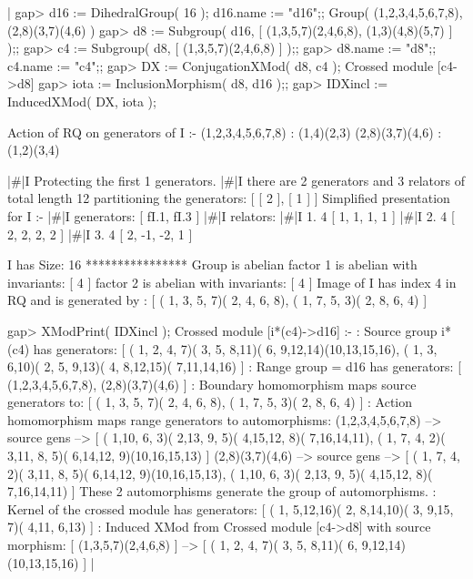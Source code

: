 |    gap> d16 := DihedralGroup( 16 );  d16.name := "d16";;
    Group( (1,2,3,4,5,6,7,8), (2,8)(3,7)(4,6) )
    gap> d8 := Subgroup( d16, [ (1,3,5,7)(2,4,6,8), (1,3)(4,8)(5,7) ] );;
    gap> c4 := Subgroup( d8, [ (1,3,5,7)(2,4,6,8) ] );;
    gap> d8.name :=  "d8";;  c4.name := "c4";;
    gap> DX := ConjugationXMod( d8, c4 );
    Crossed module [c4->d8]
    gap> iota := InclusionMorphism( d8, d16 );;
    gap> IDXincl := InducedXMod( DX, iota );

    Action of RQ on generators of I :- 
      (1,2,3,4,5,6,7,8) : (1,4)(2,3)
      (2,8)(3,7)(4,6) : (1,2)(3,4)

    |\#|I  Protecting the first 1 generators.
    |\#|I  there are 2 generators and 3 relators of total length 12
    partitioning the generators: [ [ 2 ], [ 1 ] ]
    Simplified presentation for I :- 
    |\#|I  generators: [ fI.1, fI.3 ]
    |\#|I  relators:
    |\#|I  1.  4  [ 1, 1, 1, 1 ]
    |\#|I  2.  4  [ 2, 2, 2, 2 ]
    |\#|I  3.  4  [ 2, -1, -2, 1 ]

     I has Size: 16
    **************** 
    Group is abelian 
    factor 1 is abelian with invariants: [ 4 ]
    factor 2 is abelian with invariants: [ 4 ]
    Image of I has index 4 in RQ and is generated by :   
    [ ( 1, 3, 5, 7)( 2, 4, 6, 8), ( 1, 7, 5, 3)( 2, 8, 6, 4) ]

    gap> XModPrint( IDXincl );
    Crossed module [i*(c4)->d16] :- 
    : Source group i*(c4) has generators:
      [ ( 1, 2, 4, 7)( 3, 5, 8,11)( 6, 9,12,14)(10,13,15,16), 
        ( 1, 3, 6,10)( 2, 5, 9,13)( 4, 8,12,15)( 7,11,14,16) ]
    : Range group = d16 has generators:
      [ (1,2,3,4,5,6,7,8), (2,8)(3,7)(4,6) ]
    : Boundary homomorphism maps source generators to:
      [ ( 1, 3, 5, 7)( 2, 4, 6, 8), ( 1, 7, 5, 3)( 2, 8, 6, 4) ]
    : Action homomorphism maps range generators to automorphisms:
      (1,2,3,4,5,6,7,8) --> { source gens --> 
    [ ( 1,10, 6, 3)( 2,13, 9, 5)( 4,15,12, 8)( 7,16,14,11), 
      ( 1, 7, 4, 2)( 3,11, 8, 5)( 6,14,12, 9)(10,16,15,13) ] }
      (2,8)(3,7)(4,6) --> { source gens --> 
    [ ( 1, 7, 4, 2)( 3,11, 8, 5)( 6,14,12, 9)(10,16,15,13), 
      ( 1,10, 6, 3)( 2,13, 9, 5)( 4,15,12, 8)( 7,16,14,11) ] }
      These 2 automorphisms generate the group of automorphisms.
    : Kernel of the crossed module has generators:
      [ ( 1, 5,12,16)( 2, 8,14,10)( 3, 9,15, 7)( 4,11, 6,13) ]
    : Induced XMod from Crossed module [c4->d8]  with source morphism:
      [ (1,3,5,7)(2,4,6,8) ]
       --> [ ( 1, 2, 4, 7)( 3, 5, 8,11)( 6, 9,12,14)(10,13,15,16) ]  |



